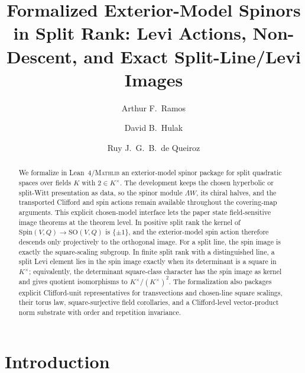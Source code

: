 \documentclass{birkjour}
\title[Formalized exterior-model spinors in split rank]
  {Formalized Exterior-Model Spinors in Split Rank: Levi Actions,
   Non-Descent, and Exact Split-Line/Levi Images}
\theoremstyle{plain}
\theoremstyle{definition}
\theoremstyle{remark}
\newcommand{\Spin}{\mathrm{Spin}}
\newcommand{\SO}{\mathrm{SO}}
\newcommand{\wedgeW}{\Lambda W}
\newcommand{\Lean}{Lean~4\xspace}
\newcommand{\Mathlib}{\textsc{Mathlib}\xspace}
\begin{document}
\author[A.~F.~Ramos]{Arthur F.~Ramos}
\address{Microsoft, USA}

\author[D.~B.~Hulak]{David B.~Hulak}
\address{Independent Researcher, Brazil}

\author[R.~J.~G.~B.~de Queiroz]{Ruy J.~G.~B.~de Queiroz}
\address{Centro de Inform\'atica, Universidade Federal de Pernambuco, Brazil}



\begin{abstract}
We formalize in \Lean/\Mathlib an exterior-model spinor package for split
quadratic spaces over fields $K$ with $2\in K^\times$. The development keeps the
chosen hyperbolic or split-Witt presentation as data, so the spinor module
$\wedgeW$, its chiral halves, and the transported Clifford and spin actions
remain available throughout the covering-map arguments. This explicit
chosen-model interface lets the paper state field-sensitive image theorems at
the theorem level. In positive split rank the kernel of
$\Spin(V,Q)\to\SO(V,Q)$ is $\{\pm1\}$, and the exterior-model spin action
therefore descends only projectively to the orthogonal image. For a split line,
the spin image is exactly the square-scaling subgroup. In finite split rank with
a distinguished line, a split Levi element lies in the spin image exactly when
its determinant is a square in $K^\times$; equivalently, the determinant
square-class character has the spin image as kernel and gives quotient
isomorphisms to $K^\times/(K^\times)^2$. The formalization also packages
explicit Clifford-unit representatives for transvections and chosen-line square
scalings, their torus law, square-surjective field corollaries, and a
Clifford-level vector-product norm substrate with order and repetition
invariance.
\end{abstract}

\maketitle

\section{Introduction}
\label{sec:intro}
\end{document}
